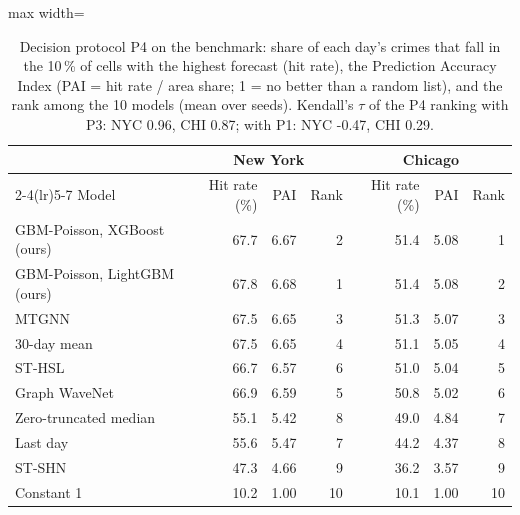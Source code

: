 \begin{table}[!htbp]\centering\small\setlength{\tabcolsep}{4pt}
\caption{Decision protocol P4 on the benchmark: share of each day's crimes that fall in the 10\,\% of cells with the highest forecast (hit rate), the Prediction Accuracy Index (PAI = hit rate / area share; 1 = no better than a random list), and the rank among the 10 models (mean over seeds). Kendall's $\tau$ of the P4 ranking with P3: NYC 0.96, CHI 0.87; with P1: NYC -0.47, CHI 0.29.}\label{tab:decision}
\begin{adjustbox}{max width=\linewidth}\begin{tabular}{lrrrrrr}\toprule
 & \multicolumn{3}{c}{New York} & \multicolumn{3}{c}{Chicago}\\\cmidrule(lr){2-4}\cmidrule(lr){5-7}
Model & Hit rate (\%) & PAI & Rank & Hit rate (\%) & PAI & Rank\\\midrule
GBM-Poisson, XGBoost (ours) & 67.7 & 6.67 & 2 & 51.4 & 5.08 & 1 \\
GBM-Poisson, LightGBM (ours) & 67.8 & 6.68 & 1 & 51.4 & 5.08 & 2 \\
MTGNN & 67.5 & 6.65 & 3 & 51.3 & 5.07 & 3 \\
30-day mean & 67.5 & 6.65 & 4 & 51.1 & 5.05 & 4 \\
ST-HSL & 66.7 & 6.57 & 6 & 51.0 & 5.04 & 5 \\
Graph WaveNet & 66.9 & 6.59 & 5 & 50.8 & 5.02 & 6 \\
Zero-truncated median & 55.1 & 5.42 & 8 & 49.0 & 4.84 & 7 \\
Last day & 55.6 & 5.47 & 7 & 44.2 & 4.37 & 8 \\
ST-SHN & 47.3 & 4.66 & 9 & 36.2 & 3.57 & 9 \\
Constant 1 & 10.2 & 1.00 & 10 & 10.1 & 1.00 & 10 \\
\bottomrule\end{tabular}\end{adjustbox}\end{table}
